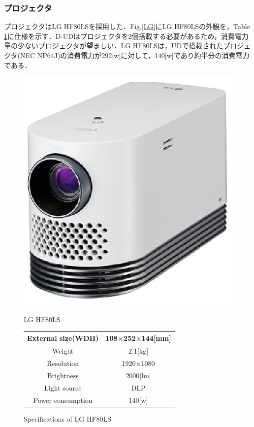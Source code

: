 \documentclass[12pt]{sonota/aislab}
\begin{document}
\subsubsection{プロジェクタ}
プロジェクタはLG HF80LSを採用した．Fig.\ref{LG}にLG HF80LSの外観を，Table \ref{table:LG}に仕様を示す．D-UDはプロジェクタを2個搭載する必要があるため，消費電力量の少ないプロジェクタが望ましい．LG HF80LSは，UDで搭載されたプロジェクタ(NEC NP64J)の消費電力が292[w]に対して，140[w]であり約半分の消費電力である．

\begin{figure}
\begin{minipage}{0.4\textwidth}
\begin{center}
\includegraphics[scale=0.5]{figs/lg_projector.eps}
\caption{LG HF80LS}
\label{LG}
\end{center}
\end{minipage}
\begin{minipage}{0.5\textwidth}
\begin{center}
\makeatletter
\def\@captype{table}
\makeatother
\caption{Specifications of LG HF80LS}
	\begin{tabular}[tbp]{|c|c|}
		\hline 
		External size(WDH) & 108×252×144[mm] \\\hline
		Weight & 2.1[kg] \\\hline
		Resolution & 1920×1080 \\\hline
		Brightness & 2000[lm] \\\hline
		Light source & DLP \\\hline
		Power consumption & 140[w] \\\hline
	\end{tabular}
\label{table:LG}
\end{center}
\end{minipage}
\end{figure}
\end{document}

